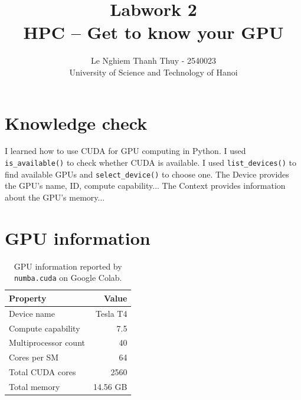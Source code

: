 \documentclass[10pt]{article}
\title{Labwork 2\\\large HPC -- Get to know your GPU}
\author{
Le Nghiem Thanh Thuy - 2540023\\
University of Science and Technology of Hanoi
}
\date{}
\begin{document}
\maketitle
\section{Knowledge check}
I learned how to use CUDA for GPU computing in Python.
I used \texttt{is\_available()} to check whether CUDA is available.
I used \texttt{list\_devices()} to find available GPUs and \texttt{select\_device()} to choose one.
The Device provides the GPU’s name, ID, compute capability...
The Context provides information about the GPU’s memory...

\section{GPU information}

\begin{table}[H]
\centering
\caption{GPU information reported by \texttt{numba.cuda} on Google Colab.}
\label{tab:gpu}
\begin{tabular}{lr}
\toprule
\textbf{Property} & \textbf{Value} \\
\midrule
Device name & Tesla T4 \\
Compute capability & 7.5 \\
Multiprocessor count & 40 \\
Cores per SM & 64 \\
Total CUDA cores & 2560 \\
Total memory & 14.56 GB \\
\bottomrule
\end{tabular}
\end{table}
\end{document}
